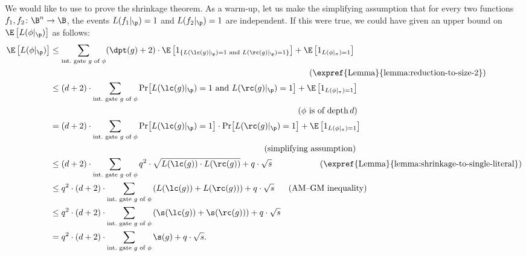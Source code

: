 We would like to use 
to prove the shrinkage theorem. As a warm-up, let us make the simplifying
assumption that for every two functions $f_{1},f_{2}\colon\B^{n}\to\B$,
the events $L(f_{1}|_{\p})=1$ and $L(f_{2}|_{\p})=1$ are independent.
If this were true, we could have
%
given an upper bound on %
$\E\left[L(\phi|_{\p})\right]$
as follows: 
%
%
%
%
%
%
%
%
%
%
%
%
\begin{align*}
\E\left[L(\phi|_{\p})\right] & \le\sum_{\text{int.\ gate \ensuremath{g} of \ensuremath{\phi}}}(\dpt(g)+2)\cdot\E\left[1_{\left\{ L(\lc(g)|_{\p})=1\text{ and }L(\rc(g)|_{\p})=1\right\} }\right] 
 +\E\left[1_{L(\phi|_{\pi})=1}\right]\\
 & \qquad\qquad\qquad\qquad\qquad\qquad\qquad\qquad\qquad
   \qquad\qquad\qquad\qquad\qquad\qquad\ \
\text{(\expref{Lemma}{lemma:reduction-to-size-2})}\\        %
 & \le(d+2)\cdot\sum_{\text{int.\ gate \ensuremath{g} of \ensuremath{\phi}}}\Pr\!\left[L(\lc(g)|_{\p})=1\text{ and }L(\rc(g)|_{\p})=1\right] 
 +\E\left[1_{L(\phi|_{\pi})=1}\right]\\
 & \qquad\qquad\qquad\qquad\qquad\qquad\qquad\qquad\qquad
   \qquad\qquad\qquad\qquad\qquad\quad\ 
\text{(\ensuremath{\phi} is of depth\,\ensuremath{d})}\\ %
 & =(d+2)\cdot\sum_{\text{int.\ gate \ensuremath{g} of \ensuremath{\phi}}}\Pr\!\left[L(\lc(g)|_{\p})=1\right]\cdot\Pr\!\left[L(\rc(g)|_{\p})=1\right] 
  +\E\left[1_{L(\phi|_{\pi})=1}\right]\\
& \qquad\qquad\qquad\qquad\qquad\qquad\qquad\qquad\qquad
  \qquad\qquad\qquad\quad\ 
\text{(simplifying assumption)}\\          %
  & \le(d+2)\cdot\sum_{\text{int.\ gate \ensuremath{g} of \ensuremath{\phi}}}q^{2}\cdot\sqrt{L(\lc(g))\cdot L(\rc(g))}+q\cdot\sqrt{s}
\qquad\qquad\quad\ \
  \text{(\expref{Lemma}{lemma:shrinkage-to-single-literal})}\\  %
& \le q^{2}\cdot(d+2)\cdot\sum_{\text{int.\ gate \ensuremath{g} of \ensuremath{\phi}}}\left(L(\lc(g))+L(\rc(g))\right)+q\cdot\sqrt{s}
  \quad\ \    \text{(AM--GM inequality)}\\              %
%
 & \le q^{2}\cdot(d+2)\cdot\sum_{\text{int.\ gate \ensuremath{g} of \ensuremath{\phi}}}\left(\s(\lc(g))+\s(\rc(g))\right)+q\cdot\sqrt{s}\\
 & =q^{2}\cdot(d+2)\cdot\sum_{\text{int.\ gate \ensuremath{g} of \ensuremath{\phi}}}\s(g)+q\cdot\sqrt{s}.
\end{align*}  
